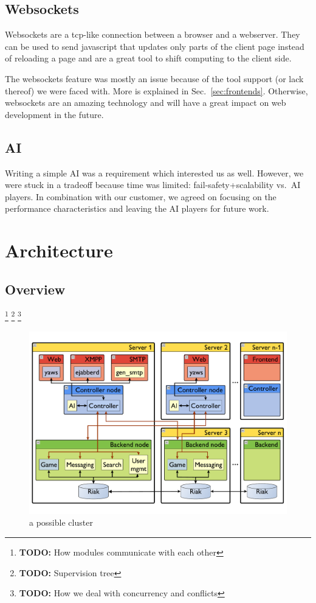 \documentclass[11pt,a4paper]{report}
\newcommand{\todo}[1]{\footnote{{\color{red} {\bf TODO:} #1}}}
\begin{document}
\subsection{Websockets}
Websockets are a tcp-like connection between a browser and a webserver.
They can be used to send javascript that updates only parts of the client page
instead of reloading a page and are a great tool to shift computing to the 
client side.

The websockets feature was mostly an issue because of the tool support (or lack
thereof) we were faced with. More is explained in Sec.~\ref{sec:frontends}.
Otherwise, websockets are an amazing technology and will have a great impact on
web development in the future.

\subsection{AI}
Writing a simple AI was a requirement which interested us as well. However, we
were stuck in a tradeoff because time was limited: fail-safety+scalability
vs.\ AI players. In combination with our customer, we agreed on focusing on the
performance characteristics and leaving the AI players for future work.

\section{Architecture}
\subsection{Overview}
\todo{How modules communicate with each other}
\todo{Supervision tree}
\todo{How we deal with concurrency and conflicts}

\begin{figure}[h]
 \centering
 \includegraphics[width=13cm]{./graphics/arch.pdf}
 \caption{a possible cluster}
 \label{fig:arch}
\end{figure}
\end{document}
